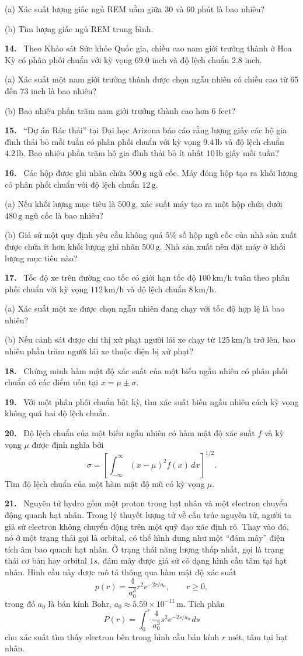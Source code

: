 \documentclass[12pt,a4paper]{article}
\newcommand{\bt}[1]{\par\smallskip\Needspace{5\baselineskip}\noindent\textbf{#1.}\ }
\begin{document}
(a) Xác suất lượng giấc ngủ REM nằm giữa 30 và 60 phút là bao nhiêu?

(b) Tìm lượng giấc ngủ REM trung bình.
\bt{14} Theo Khảo sát Sức khỏe Quốc gia, chiều cao nam giới trưởng thành ở Hoa Kỳ có phân phối chuẩn với kỳ vọng 69.0 inch và độ lệch chuẩn 2.8 inch.

(a) Xác suất một nam giới trưởng thành được chọn ngẫu nhiên có chiều cao từ 65 đến 73 inch là bao nhiêu?

(b) Bao nhiêu phần trăm nam giới trưởng thành cao hơn 6 feet?
\bt{15} “Dự án Rác thải” tại Đại học Arizona báo cáo rằng lượng giấy các hộ gia đình thải bỏ mỗi tuần có phân phối chuẩn với kỳ vọng $9.4\,\mathrm{lb}$ và độ lệch chuẩn $4.2\,\mathrm{lb}$. Bao nhiêu phần trăm hộ gia đình thải bỏ ít nhất $10\,\mathrm{lb}$ giấy mỗi tuần?
\bt{16} Các hộp được ghi nhãn chứa $500\,\mathrm g$ ngũ cốc. Máy đóng hộp tạo ra khối lượng có phân phối chuẩn với độ lệch chuẩn $12\,\mathrm g$.

(a) Nếu khối lượng mục tiêu là $500\,\mathrm g$, xác suất máy tạo ra một hộp chứa dưới $480\,\mathrm g$ ngũ cốc là bao nhiêu?

(b) Giả sử một quy định yêu cầu không quá $5\%$ số hộp ngũ cốc của nhà sản xuất được chứa ít hơn khối lượng ghi nhãn $500\,\mathrm g$. Nhà sản xuất nên đặt máy ở khối lượng mục tiêu nào?
\bt{17} Tốc độ xe trên đường cao tốc có giới hạn tốc độ $100\,\mathrm{km/h}$ tuân theo phân phối chuẩn với kỳ vọng $112\,\mathrm{km/h}$ và độ lệch chuẩn $8\,\mathrm{km/h}$.

(a) Xác suất một xe được chọn ngẫu nhiên đang chạy với tốc độ hợp lệ là bao nhiêu?

(b) Nếu cảnh sát được chỉ thị xử phạt người lái xe chạy từ $125\,\mathrm{km/h}$ trở lên, bao nhiêu phần trăm người lái xe thuộc diện bị xử phạt?
\bt{18} Chứng minh hàm mật độ xác suất của một biến ngẫu nhiên có phân phối chuẩn có các điểm uốn tại $x=\mu\pm\sigma$.
\bt{19} Với một phân phối chuẩn bất kỳ, tìm xác suất biến ngẫu nhiên cách kỳ vọng không quá hai độ lệch chuẩn.
\bt{20} Độ lệch chuẩn của một biến ngẫu nhiên có hàm mật độ xác suất $f$ và kỳ vọng $\mu$ được định nghĩa bởi
\[\sigma=\left[\int_{-\infty}^{\infty}(x-\mu)^2f(x)\,dx\right]^{1/2}.\]
Tìm độ lệch chuẩn của một hàm mật độ mũ có kỳ vọng $\mu$.
\begingroup\small\bt{21} Nguyên tử hydro gồm một proton trong hạt nhân và một electron chuyển động quanh hạt nhân. Trong lý thuyết lượng tử về cấu trúc nguyên tử, người ta giả sử electron không chuyển động trên một quỹ đạo xác định rõ. Thay vào đó, nó ở một trạng thái gọi là orbital, có thể hình dung như một “đám mây” điện tích âm bao quanh hạt nhân. Ở trạng thái năng lượng thấp nhất, gọi là trạng thái cơ bản hay orbital $1s$, đám mây được giả sử có dạng hình cầu tâm tại hạt nhân. Hình cầu này được mô tả thông qua hàm mật độ xác suất
\[p(r)=\frac4{a_0^3}r^2e^{-2r/a_0},\qquad r\ge0,\]
trong đó $a_0$ là bán kính Bohr, $a_0\approx5.59\times10^{-11}\,\mathrm m$. Tích phân
\[P(r)=\int_{0}^{r}\frac4{a_0^3}s^2e^{-2s/a_0}\,ds\]
cho xác suất tìm thấy electron bên trong hình cầu bán kính $r$ mét, tâm tại hạt nhân.
\end{document}
